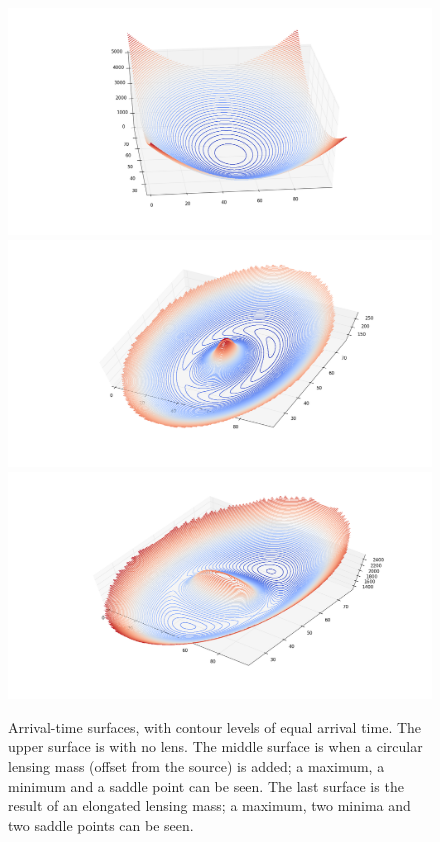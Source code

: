 \documentclass[12pt,preprint]{aastex}
\begin{document}
\begin{figure}
\centering
\includegraphics[height=.3\vsize]{fig/arriv1}
\includegraphics[height=.3\vsize]{fig/arriv2}
\includegraphics[height=.3\vsize]{fig/arriv3}
\caption{Arrival-time surfaces, with contour levels of equal arrival
  time.  The upper surface is with no lens.  The middle surface is
  when a circular lensing mass (offset from the source) is added; a
  maximum, a minimum and a saddle point can be seen.  The last surface
  is the result of an elongated lensing mass; a maximum, two minima
  and two saddle points can be seen.
}
\label{fig:arriv}
\end{figure}
\end{document}
